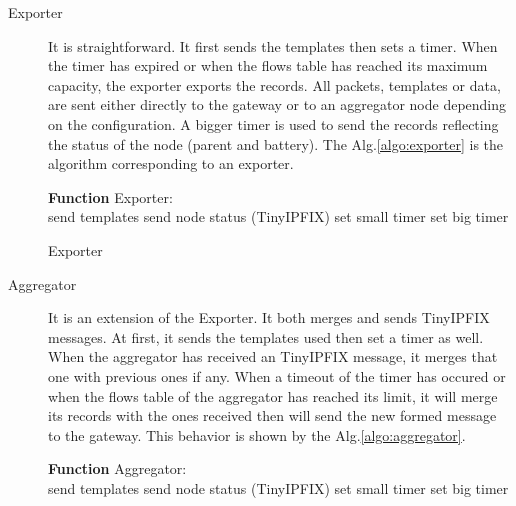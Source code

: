 \begin{description}
  \item[Exporter] It is straightforward. It first sends the templates then sets a timer. When the timer has expired or when the flows table has reached its maximum capacity, the exporter exports the records. All packets, templates or data, are sent either directly to the gateway or to an aggregator node depending on the configuration. A bigger timer is used to send the records reflecting the status of the node (parent and battery). The Alg.\ref{algo:exporter} is the algorithm corresponding to an exporter.

  \begin{algorithm}
    \textbf{Function} Exporter:\\
    send templates\;
		send node status (TinyIPFIX)\;
    set small timer\;
		set big timer\;
   \caption{Exporter}
   \label{algo:exporter}
  \end{algorithm}

  \item[Aggregator] It is an extension of the Exporter. It both merges and sends TinyIPFIX messages. At first, it sends the templates used then set a timer as well. When the aggregator has received an TinyIPFIX message, it merges that one with previous ones if any. When a timeout of the timer has occured or when the flows table of the aggregator has reached its limit, it will merge its records with the ones received then will send the new formed message to the gateway. This behavior is shown by the Alg.\ref{algo:aggregator}.

  \begin{algorithm}
    \textbf{Function} Aggregator:\\
    send templates\;
		send node status (TinyIPFIX)\;
    set small timer\;
		set big timer\;
\end{algorithm}
\end{description}
